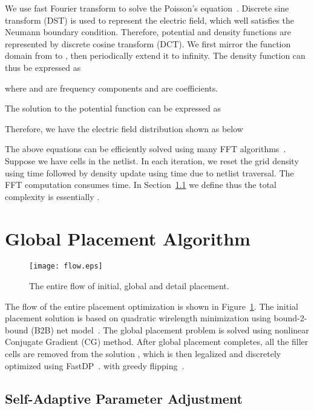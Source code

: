 \documentclass[conference,10pt]{IEEEtran}
\newcounter{def}
\begin{document}
We use fast Fourier transform 
to solve the Poisson's equation~\cite{fft_poi}.
Discrete sine transform (DST) is used  
to represent the electric field, 
which well satisfies the Neumann boundary condition. 
Therefore, potential and density functions are 
represented by discrete cosine transform (DCT).
We first mirror the function domain
from  to 
, 
then periodically extend it to infinity.
The density function can thus be expressed as 

where  and 
 are frequency components 
and  are coefficients. 

The solution to the potential function can be expressed as 

Therefore, we have the electric field distribution 
 shown as below

The above equations can be efficiently solved 
using many FFT algorithms~\cite{fft}.
Suppose we have  cells in the netlist.
In each iteration,
we reset the grid density using  time 
followed by density update using  time due to netlist traversal.
The FFT computation consumes  time. 
In Section~\ref{subsec:gp_par} we define  thus the 
total complexity is essentially .







\section{Global Placement Algorithm}
\label{sec:gp}
\vspace{-0.05in}

\begin{figure}[http]
\centering
\texttt{[image: flow.eps]}
\caption{The entire flow of initial, global and detail placement.}
\label{fig:flow01}
\end{figure}



The flow of the entire placement optimization is shown 
in Figure~\ref{fig:flow01}.
The initial placement solution  is based on 
quadratic wirelength minimization 
using bound-2-bound (B2B) net model~\cite{kw2}.
The global placement problem is solved 
using nonlinear Conjugate Gradient (CG) method.
After global placement completes, 
all the filler cells are removed from the 
solution , which is then legalized 
and discretely optimized
using FastDP~\cite{fastdp}.
with greedy flipping~\cite{capo}.


\subsection{Self-Adaptive Parameter Adjustment}
\label{subsec:gp_par}
\end{document}
